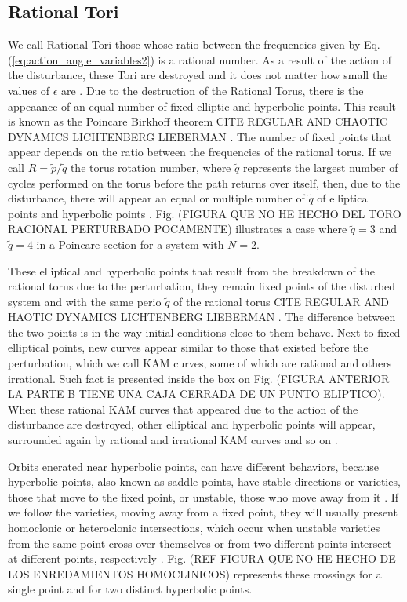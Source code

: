 \subsection{Rational Tori}
We call Rational Tori those whose ratio between the frequencies given by Eq.(\ref{eq:action_angle_variables2}) is a rational number. As a result of the action of the disturbance, these Tori are destroyed and it does not matter how small the values of $\epsilon$ are \cite{ottChaosDynamicalSystems2002}. Due to the destruction of the Rational Torus, there is the appeaance of an equal number of fixed elliptic and hyperbolic points. This result is known as the Poincar\´e Birkhoff theorem CITE REGULAR AND CHAOTIC DYNAMICS LICHTENBERG LIEBERMAN . The number of fixed points that appear depends on the ratio between the frequencies of the rational torus. If we call $R=\tilde{p}/\tilde{q}$ the torus rotation number, where $\tilde{q}$ represents the largest number of cycles performed on the torus before the path returns over itself, then, due to the disturbance, there will appear an equal or multiple number of $\tilde{q}$ of elliptical points and hyperbolic points \cite{ottChaosDynamicalSystems2002}. Fig. (FIGURA QUE NO HE HECHO DEL TORO RACIONAL PERTURBADO POCAMENTE) illustrates a case where $\tilde{q}=3$ and $\tilde{q}=4$ in a Poincar\´e section for a system with $N=2$.\par

These elliptical and hyperbolic points that result from the breakdown of the rational torus due to the perturbation, they remain fixed points of the disturbed system and with the same perio $\tilde{q}$ of the rational torus CITE REGULAR AND HAOTIC DYNAMICS LICHTENBERG LIEBERMAN . The difference between the two points is in the way initial conditions close to them behave. Next to fixed elliptical points, new curves appear similar to those that existed before the perturbation, which we call KAM curves, some of which are rational and others irrational. Such fact is presented inside the box on Fig. (FIGURA ANTERIOR LA PARTE B TIENE UNA CAJA CERRADA DE UN PUNTO ELIPTICO). When these rational KAM curves that appeared due to the action of the disturbance are destroyed, other elliptical and hyperbolic points will appear, surrounded again by rational and irrational KAM curves and so on \cite{ottChaosDynamicalSystems2002}.\par

Orbits enerated near hyperbolic points, can have different behaviors, because hyperbolic points, also known as saddle points, have stable directions or varieties, those that move to the fixed point, or unstable, those who move away from it \cite{ottChaosDynamicalSystems2002}. If we follow the varieties, moving away from a fixed point, they will usually present homoclonic or heteroclonic intersections, which occur when unstable varieties from the same point cross over themselves or from two different points intersect at different points, respectively \cite{ottChaosDynamicalSystems2002}. Fig. (REF FIGURA QUE NO HE HECHO DE LOS ENREDAMIENTOS HOMOCLINICOS) represents these crossings for a single point and for two distinct hyperbolic points.\par 

